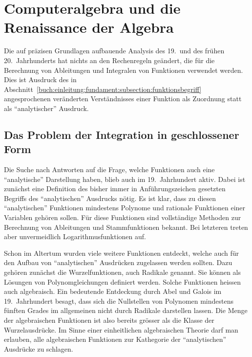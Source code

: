 %
%
%
\section{Computeralgebra und die Renaissance der Algebra}
Die auf präzisen Grundlagen aufbauende Analysis des 19.~und des
frühen 20.~Jahrhunderts hat nichts an den Rechenregeln geändert,
die für die Berechnung von Ableitungen und Integralen von Funktionen
verwendet werden.
%
Dies ist Ausdruck des in
Abschnitt~\ref{buch:einleitung:fundament:subsection:funktionsbegriff}
angesprochenen veränderten Verständnisses einer Funktion als
Zuordnung statt als ``analytischer'' Ausdruck.

%
%
\subsection{Das Problem der Integration in geschlossener Form}
Die Suche nach Antworten auf die Frage, welche Funktionen auch
eine ``analytische'' Darstellung haben, blieb auch im 19.~Jahrhundert
aktiv.
Dabei ist zunächst eine Definition des bisher immer in Anführungszeichen
gesetzten Begriffs des ``analytischen'' Ausdrucks nötig.
Es ist klar, dass zu diesen ``analytischen'' Funktionen mindestens
Polynome und rationale Funktionen einer Variablen gehören sollen.
Für diese Funktionen sind vollständige Methoden zur Berechnung von
Ableitungen und Stammfunktionen bekannt.
Bei letzteren treten aber unvermeidlich Logarithmusfunktionen auf.
%

Schon im Altertum wurden viele weitere Funktionen entdeckt, welche auch
für den Aufbau von ``analytischen'' Ausdrücken zugelassen werden sollten.
Dazu gehören zunächst die Wurzelfunktionen, auch Radikale genannt.
%
%
Sie können als Lösungen von Polynomgleichungen definiert werden.
Solche Funktionen heissen auch algebraisch.
%
Ein bedeutende Entdeckung durch Abel und Galois im 19.~Jahrhundert
%
%
besagt, dass sich die Nullstellen von Polynomen mindestens fünften
Grades im allgemeinen nicht durch Radikale darstellen lassen.
Die Menge der algebraischen Funktionen ist also bereits grösser als
die Klasse der Wurzelausdrücke.
%
Im Sinne einer einheitlichen algebraischen Theorie darf man erlauben,
alle algebraischen Funktionen zur Kathegorie der ``analytischen'' Ausdrücke
zu schlagen.

